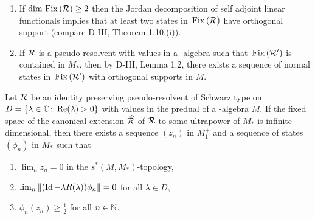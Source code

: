 \begin{remark}\label{rem:d4-4.2}
\begin{enumerate}[\upshape (i), wide, labelindent=.5em]
\item
If $ \dim \mathop{}\mathrm{Fix}\left(\mathcal{R}\right) \geq 2 $  then the Jordan decomposition of self adjoint linear functionals implies that at least two states in $ \mathop{}\mathrm{Fix}\left(\mathcal{R}\right) $  have orthogonal support (compare D-III, Theorem 1.10.(i)).

\item
If $ \mathcal{R} $  is a pseudo-resolvent with values in a \WA-algebra such that $ \mathop{}\mathrm{Fix}\left(\mathcal{R}'\right) $  is contained in $ M_{*} $,  then by D-III, Lemma 1.2, there exists a sequence of normal states in $ \mathop{}\mathrm{Fix}\left(\mathcal{R}'\right) $  with orthogonal supports in $ M $.
\end{enumerate}
\end{remark}
\begin{lemma}\label{lem:d4-4.3}
Let $ \mathcal{R} $  be an identity preserving pseudo-resolvent of Schwarz type on $ D = \{\lambda \in \mathbb{C} \colon  \mathop{}\!\mathrm{Re}(\lambda) > 0\} $  with values in the predual of a \WA-algebra $ M $.
If the fixed space of the canonical extension $ \widehat{\mathcal{R}} $  of\/ $ \mathcal{R} $  to some ultrapower of\/ $ M_{*} $  is infinite dimensional, then there exists a sequence $ (z_{n}) $  in $ M_{1}^{+} $  and a sequence of states $ (\phi_{n}) $  in $ M_{*} $  such that
\begin{enumerate}[\upshape (i)]

\item\label{item:d4-4.3-i}
$ \lim_{n} z_{n} = 0 $  in the $ s^{*}(M,M_{*}) $-topology,

\item\label{item:d4-4.3-ii}
$ \lim_{n} \|(\operatorname{Id} - \lambda R(\lambda))\phi_{n}\| = 0 $  for all $ \lambda \in D $,

\item\label{item:d4-4.3-iii}
$ \phi_{n}(z_{n}) \geq \frac{1}{2} $  for all $ n \in \mathbb{N} $. 
\end{enumerate}
\end{lemma}
